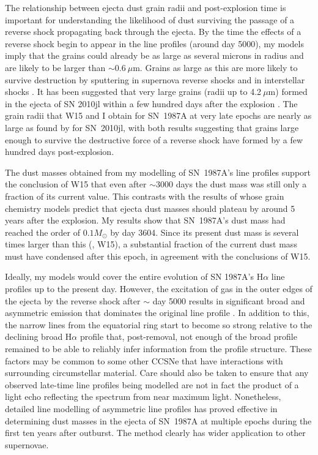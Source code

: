 The relationship between ejecta dust grain radii and post-explosion 
time is important for understanding the likelihood of dust surviving the 
passage of a reverse shock propagating back through the ejecta. By the 
time the effects of a reverse shock begin to appear in the line profiles 
(around day 5000), my models imply that the grains could already be as 
large as several microns in radius and are likely to be larger than $\sim 
0.6~\mu$m. Grains as large as this are more likely to survive destruction 
by sputtering in supernova reverse shocks and in interstellar shocks 
\citep{Silvia2010, Silvia2012, Slavin2015}.
It has been suggested that very large grains (radii up to 4.2$~\mu$m) 
formed in the ejecta of SN 2010jl within a few hundred days after the 
explosion \cite{Gall2014}. The grain radii that W15 and I obtain 
for SN~1987A at very late epochs are nearly as large as found by 
\citet{Gall2014} for SN~2010jl, with both results suggesting that grains 
large enough to survive the destructive force of a reverse shock have 
formed by a few hundred days post-explosion. 

The dust masses obtained from my modelling of SN~1987A's line profiles 
support the conclusion of W15 that even after $\sim$3000 days the dust 
mass was still only a fraction of its current value. This contrasts with 
the results of \citet{Sarangi2015} whose grain chemistry models predict 
that ejecta dust masses should plateau by around 5 years after the 
explosion. My results show that SN~1987A's dust mass had reached 
the order of $0.1M_{\odot}$ by day 3604.  Since its present dust mass is 
several times larger than this (\citet{Matsuura2015}, W15), a 
substantial fraction of the current dust mass must have condensed after 
this epoch, in agreement with the conclusions of W15.

Ideally, my models would cover the entire evolution of SN 1987A's 
H$\alpha$ line profiles up to the present day.  However, the excitation of 
gas in the outer edges of the ejecta by the reverse shock after $\sim$ day 
5000 results in significant broad and asymmetric emission that 
dominates the original line profile \citep{Fransson2013}.  In addition to 
this, the narrow lines from the equatorial ring start to become so 
strong relative to the declining broad H$\alpha$ profile that, 
post-removal, not enough of the broad profile remained to be 
able to reliably infer information from the profile structure. These 
factors may be 
common to some other CCSNe that have interactions with surrounding 
circumstellar material. Care should also be taken to ensure that any 
observed late-time line profiles being modelled are not in fact the 
product of a light echo reflecting the spectrum from near maximum light. 
Nonetheless, detailed line modelling of asymmetric line profiles has 
proved effective in determining dust masses in the ejecta of SN~1987A at 
multiple epochs during the first ten years after outburst. The method 
clearly has wider application to other supernovae.



